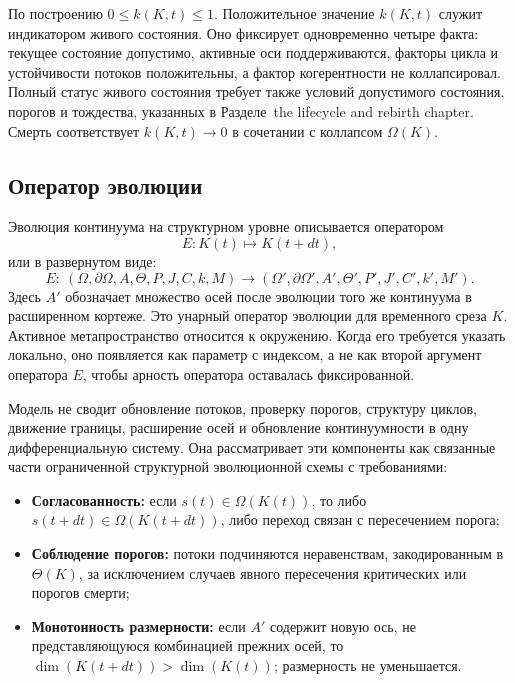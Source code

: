 По построению \(0 \le k(K,t) \le 1\).
Положительное значение \(k(K,t)\) служит индикатором живого состояния.
Оно фиксирует одновременно четыре факта: текущее состояние допустимо,
активные оси поддерживаются, факторы цикла и устойчивости потоков положительны,
а фактор когерентности не коллапсировал. Полный статус живого состояния
требует также условий допустимого состояния, порогов и тождества,
указанных в Разделе~the lifecycle and rebirth chapter.
Смерть соответствует \(k(K,t)\to 0\) в сочетании с коллапсом \(\Omega(K)\).

\subsection{Оператор эволюции}

Эволюция континуума на структурном уровне описывается оператором
\[
    E: K(t) \mapsto K(t+dt),
\]
или в развернутом виде:
\[
    E:\ (\Omega,\partial\Omega,A,\Theta,P,J,C,k,M)
    \longrightarrow (\Omega',\partial\Omega',A',\Theta',P',J',C',k',M').
\]
Здесь \(A'\) обозначает множество осей после эволюции того же континуума в расширенном кортеже.
Это унарный оператор эволюции для временного среза \(K\).
Активное метапространство относится к окружению. Когда его требуется указать локально,
оно появляется как параметр с индексом, а не как второй аргумент оператора \(E\),
чтобы арность оператора оставалась фиксированной.

Модель не сводит обновление потоков, проверку порогов, структуру циклов,
движение границы, расширение осей и обновление континуумности в одну
дифференциальную систему. Она рассматривает эти компоненты как связанные части
ограниченной структурной эволюционной схемы с требованиями:

\begin{itemize}
    \item \textbf{Согласованность:} если \(s(t) \in \Omega(K(t))\), то либо
          \(s(t+dt) \in \Omega(K(t+dt))\), либо переход связан с пересечением порога;
    \item \textbf{Соблюдение порогов:} потоки подчиняются неравенствам, закодированным в \(\Theta(K)\),
          за исключением случаев явного пересечения критических или порогов смерти;
    \item \textbf{Монотонность размерности:} если \(A'\) содержит новую ось, не представляющуюся
          комбинацией прежних осей, то \(\dim(K(t+dt)) > \dim(K(t))\); размерность не уменьшается.
\end{itemize}

